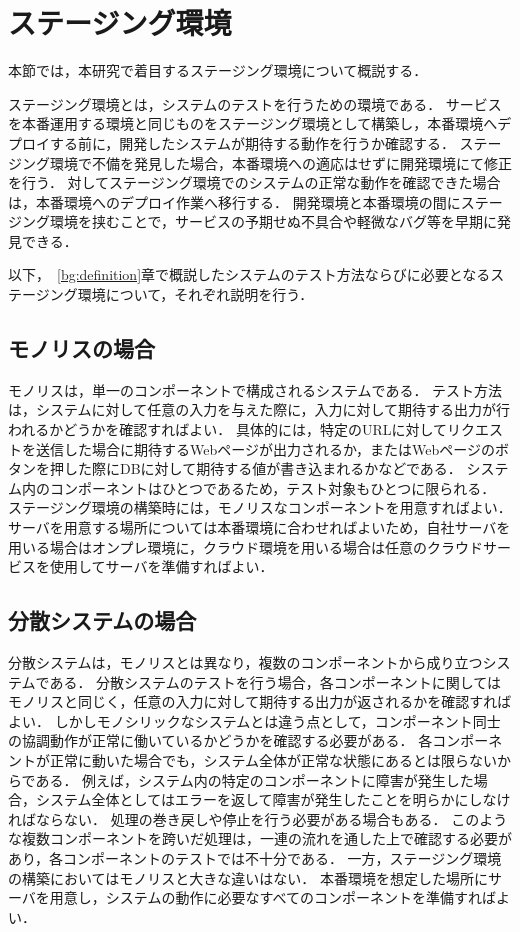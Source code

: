 \section{ステージング環境}
\label{bg:staging}

本節では，本研究で着目するステージング環境について概説する．

ステージング環境とは，システムのテストを行うための環境である．
サービスを本番運用する環境と同じものをステージング環境として構築し，本番環境へデプロイする前に，開発したシステムが期待する動作を行うか確認する．
ステージング環境で不備を発見した場合，本番環境への適応はせずに開発環境にて修正を行う．
対してステージング環境でのシステムの正常な動作を確認できた場合は，本番環境へのデプロイ作業へ移行する．
開発環境と本番環境の間にステージング環境を挟むことで，サービスの予期せぬ不具合や軽微なバグ等を早期に発見できる．

以下，~\ref{bg:definition}章で概説したシステムのテスト方法ならびに必要となるステージング環境について，それぞれ説明を行う．

\subsection{モノリスの場合}
\label{bg:staging:monolith}

モノリスは，単一のコンポーネントで構成されるシステムである．
テスト方法は，システムに対して任意の入力を与えた際に，入力に対して期待する出力が行われるかどうかを確認すればよい．
具体的には，特定のURLに対してリクエストを送信した場合に期待するWebページが出力されるか，またはWebページのボタンを押した際にDBに対して期待する値が書き込まれるかなどである．
システム内のコンポーネントはひとつであるため，テスト対象もひとつに限られる．
ステージング環境の構築時には，モノリスなコンポーネントを用意すればよい．
サーバを用意する場所については本番環境に合わせればよいため，自社サーバを用いる場合はオンプレ環境に，クラウド環境を用いる場合は任意のクラウドサービスを使用してサーバを準備すればよい．

\subsection{分散システムの場合}
\label{bg:staging:distributed-system}

分散システムは，モノリスとは異なり，複数のコンポーネントから成り立つシステムである．
分散システムのテストを行う場合，各コンポーネントに関してはモノリスと同じく，任意の入力に対して期待する出力が返されるかを確認すればよい．
しかしモノシリックなシステムとは違う点として，コンポーネント同士の協調動作が正常に働いているかどうかを確認する必要がある．
各コンポーネントが正常に動いた場合でも，システム全体が正常な状態にあるとは限らないからである．
例えば，システム内の特定のコンポーネントに障害が発生した場合，システム全体としてはエラーを返して障害が発生したことを明らかにしなければならない．
処理の巻き戻しや停止を行う必要がある場合もある．
このような複数コンポーネントを跨いだ処理は，一連の流れを通した上で確認する必要があり，各コンポーネントのテストでは不十分である．
一方，ステージング環境の構築においてはモノリスと大きな違いはない．
本番環境を想定した場所にサーバを用意し，システムの動作に必要なすべてのコンポーネントを準備すればよい．

